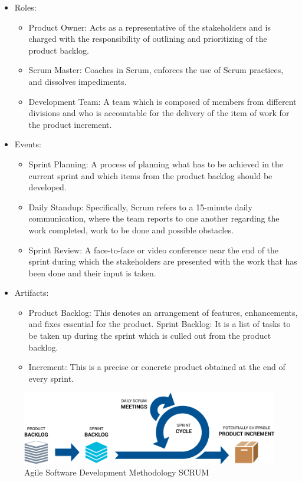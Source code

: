 \begin{itemize}
    \item Roles:
    \begin{itemize}
    \item Product Owner: Acts as a representative of the stakeholders and is charged with the responsibility of outlining and prioritizing of the product backlog.
    \item Scrum Master: Coaches in Scrum, enforces the use of Scrum practices, and dissolves impediments.
    \item Development Team: A team which is composed of members from different divisions and who is accountable for the delivery of the item of work for the product increment.
\end{itemize}
    \item Events:
    \begin{itemize}
    \item Sprint Planning: A process of planning what has to be achieved in the current sprint and which items from the product backlog should be developed.
    \item Daily Standup: Specifically, Scrum refers to a 15-minute daily communication, where the team reports to one another regarding the work completed, work to be done and possible obstacles.
    \item Sprint Review: A face-to-face or video conference near the end of the sprint during which the stakeholders are presented with the work that has been done and their input is taken.
\end{itemize}   
\item Artifacts:
\begin{itemize}
    \item Product Backlog: This denotes an arrangement of features, enhancements, and fixes essential for the product. Sprint Backlog: It is a list of tasks to be taken up during the sprint which is culled out from the product backlog.
    \item Increment: This is a precise or concrete product obtained at the end of every sprint.
\end{itemize}
\end{itemize}

\begin{figure}[H] 
            \centering
            \includegraphics[scale=0.45]{agile.png}
            \caption{Agile Software Development Methodology SCRUM} 
            \label{fig: Agile Software Development Methodology SCRUM}
\end{figure}
